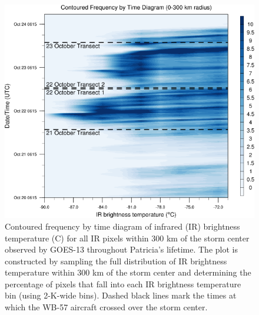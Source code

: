 \begin{figure}[ht]
\centerline{\includegraphics[width=39pc]{figures/fig09_CFTD.png}}
\caption{Contoured frequency by time diagram of infrared (IR) brightness temperature (\textdegree{}C) for all IR pixels within 300 km of the storm center observed by GOES-13 throughout Patricia’s lifetime. The plot is constructed by sampling the full distribution of IR brightness temperature within 300 km of the storm center and determining the percentage of pixels that fall into each IR brightness temperature bin (using 2-K-wide bins). Dashed black lines mark the times at which the WB-57 aircraft crossed over the
storm center.}
\label{fig:CFTD}
\end{figure}

